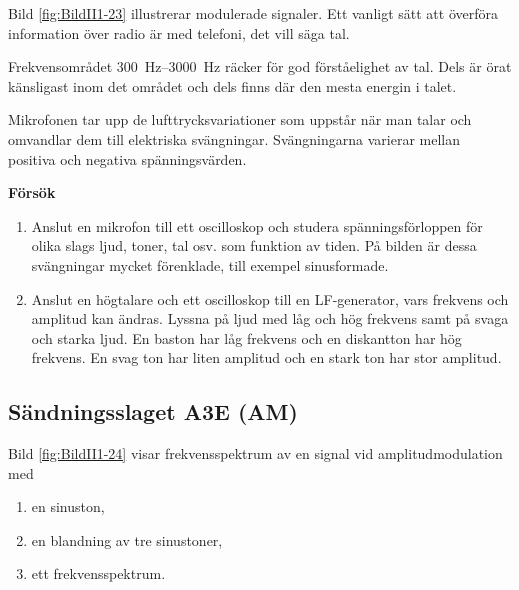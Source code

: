 
Bild \ref{fig:BildII1-23} illustrerar modulerade signaler.
Ett vanligt sätt att överföra information över radio är med telefoni, det vill
säga tal.

Frekvensområdet \SIrange{300}{3000}{\hertz} räcker för god förståelighet av tal.
Dels är örat känsligast inom det området och dels finns där den mesta energin
i talet.

Mikrofonen tar upp de lufttrycksvariationer som uppstår när man talar och
omvandlar dem till elektriska svängningar.
Svängningarna varierar mellan positiva och negativa spänningsvärden.

\textbf{Försök}

\begin{enumerate}
\item Anslut en mikrofon till ett oscilloskop och studera spänningsförloppen
  för olika slags ljud, toner, tal osv. som funktion av tiden.
  På bilden är dessa svängningar mycket förenklade, till exempel sinusformade.

\item Anslut en högtalare och ett oscilloskop till en LF-generator, vars
frekvens och amplitud kan ändras. Lyssna på ljud med låg och hög frekvens samt
på svaga och starka ljud.
En baston har låg frekvens och en diskantton har hög frekvens.
En svag ton har liten amplitud och en stark ton har stor amplitud.
\end{enumerate}

\subsection{Sändningsslaget A3E (AM)}
\label{modulation_am}


Bild \ref{fig:BildII1-24} visar frekvensspektrum av en signal vid
amplitudmodulation med

\begin{enumerate}[label=\alph*.,noitemsep]
\item en sinuston,
\item en blandning av tre sinustoner,
\item ett frekvensspektrum.
\end{enumerate}

